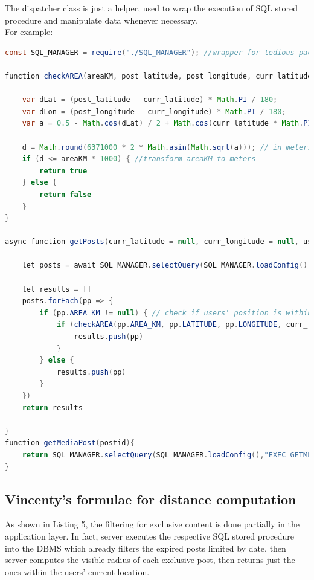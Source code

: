 \documentclass[conference]{IEEEtran}
\begin{document}
The dispatcher class is just a helper, used to wrap the execution of SQL stored procedure and manipulate data whenever necessary.
\\
For example:
\begin{lstlisting}[language=Java, caption=snippet example of dispatcher.js class]
const SQL_MANAGER = require("./SQL_MANAGER"); //wrapper for tedious package 

function checkAREA(areaKM, post_latitude, post_longitude, curr_latitude, curr_longitude) {

    var dLat = (post_latitude - curr_latitude) * Math.PI / 180;
    var dLon = (post_longitude - curr_longitude) * Math.PI / 180;
    var a = 0.5 - Math.cos(dLat) / 2 + Math.cos(curr_latitude * Math.PI / 180) * Math.cos(post_latitude * Math.PI / 180) * (1 - Math.cos(dLon)) / 2;

    d = Math.round(6371000 * 2 * Math.asin(Math.sqrt(a))); // in meters
    if (d <= areaKM * 1000) { //transform areaKM to meters
        return true
    } else {
        return false
    }
}

async function getPosts(curr_latitude = null, curr_longitude = null, username = null) {
   
    let posts = await SQL_MANAGER.selectQuery(SQL_MANAGER.loadConfig(), "EXEC GETPOSTS @USERNAME='" + username + "'")

    let results = []
    posts.forEach(pp => {
        if (pp.AREA_KM != null) { // check if users' position is within the post availability
            if (checkAREA(pp.AREA_KM, pp.LATITUDE, pp.LONGITUDE, curr_latitude, curr_longitude)) {
                results.push(pp)
            }
        } else {
            results.push(pp)
        }
    })
    return results

}
function getMediaPost(postid){
    return SQL_MANAGER.selectQuery(SQL_MANAGER.loadConfig(),"EXEC GETMEDIAPOST @POSTID="+postid)
}

\end{lstlisting}


\subsection{Vincenty's formulae for distance computation}\label{server:screening}

As shown in Listing 5, the filtering for exclusive content is done partially in the application layer.
In fact, server executes the respective SQL stored procedure into the DBMS which already filters the expired posts limited by date, then server computes the visible radius of each exclusive post, then returns just the ones within the users' current location.
\end{document}
